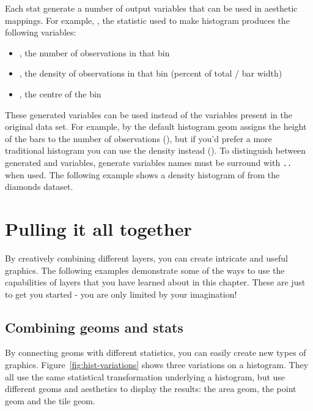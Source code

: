 Each stat generate a number of output variables that can be used in aesthetic mappings.  For example, , the statistic used to make histogram produces the following variables:

\begin{itemize}
  \item {}, the number of observations in that bin
  \item {}, the density of observations in that bin (percent of total /  bar width)
  \item {}, the centre of the bin
\end{itemize}

These generated variables can be used instead of the variables present in the original data set.  For example, by the default histogram geom assigns the height of the bars to the number of observations (), but if you'd prefer a more traditional histogram you can use the density instead ().  To distinguish between generated and variables, generate variables names must be surround with {\tt ..} when used.  The following example shows a density histogram of  from the diamonds dataset.

% 


\section{Pulling it all together}
\label{sec:pull-together}



By creatively combining different layers, you can create intricate and useful graphics.  The following examples demonstrate some of the ways to use the capabilities of layers that you have learned about in this chapter.  These are just to get you started - you are only limited by your imagination!

\subsection{Combining geoms and stats}
\label{sub:new_plot_types}

By connecting geoms with different statistics, you can easily create new types of graphics.  Figure~\ref{fig:hist-variations} shows three variations on a histogram.  They all use the same statistical transformation underlying a histogram, but use different geoms and aesthetics to display the results: the area geom, the point geom and the tile geom.  

